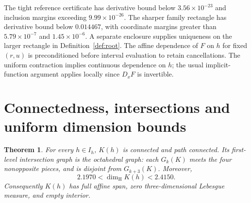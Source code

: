 \documentclass[11pt,a4paper]{article}
\newtheorem{theorem}{Theorem}[section]
\theoremstyle{definition}\newtheorem{definition}[theorem]{Definition}
\theoremstyle{remark}\newtheorem{remark}[theorem]{Remark}
\newcommand{\dimH}{\dim_{\mathrm H}}\newcommand{\dimA}{\dim_{\mathrm A}}
\begin{document}
The tight reference certificate has derivative bound below
$3.56\times10^{-23}$ and inclusion margins exceeding $9.99\times10^{-26}$.
The sharper family rectangle has derivative bound below $0.014467$, with
coordinate margins greater than $5.79\times10^{-7}$ and $1.45\times10^{-6}$.
A separate enclosure supplies uniqueness on the larger rectangle in
Definition~\ref{def:root}. The affine dependence of $F$ on $h$ for fixed
$(r,u)$ is preconditioned before interval evaluation to retain cancellations.
The uniform contraction implies continuous dependence on $h$; the usual
implicit-function argument applies locally since $D_xF$ is invertible.

\section{Connectedness, intersections and uniform dimension bounds}
\begin{theorem}\label{thm:geometry}
For every $h\in I_h$, $K(h)$ is connected and path connected. Its first-level
intersection graph is the octahedral graph: each $G_k(K)$ meets the four
nonopposite pieces, and is disjoint from $G_{k+3}(K)$. Moreover,
\begin{equation}\label{eq:uniformdim}
2.1970<\dimH K(h)<2.4150.
\end{equation}
Consequently $K(h)$ has full affine span, zero three-dimensional Lebesgue
measure, and empty interior.
\end{theorem}
\end{document}
